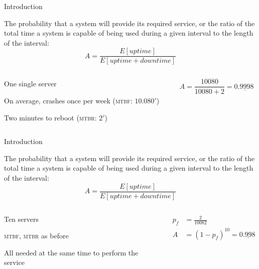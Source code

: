 \begin{frame}{Introduction}
	
\begin{definition}[Availability]
The probability that a system will provide its required service, or the ratio
of the total time a system is capable of being used during a given interval to
the length of the interval:
\[
  A = \frac{E[\mathit{uptime}]}{E[\mathit{uptime} + \mathit{downtime}] }
\]
\end{definition}

\begin{example}
\begin{columns}[t]
\begin{column}{0.55\textwidth}
\BI
\item One single server
\item On average, crashes once per week (\textsc{mtbf}: $10.080'$)
\item Two minutes to reboot (\textsc{mtbr}: $2'$)
\EI
\end{column}
\begin{column}{0.45\textwidth}
\pause
\[
  A = \frac{10080}{10080+2} = 0.\underline{999}8
\]
\end{column}
\end{columns}
\end{example}

\end{frame}

\begin{frame}{Introduction}
	
\begin{definition}[Availability]
The probability that a system will provide its required service, or the ratio
of the total time a system is capable of being used during a given interval to
the length of the interval:
\[
  A = \frac{E[\mathit{uptime}]}{E[\mathit{uptime} + \mathit{downtime}] }
\]
\end{definition}

\begin{example}
\begin{columns}[t]
\begin{column}{0.55\textwidth}
\BI
\item Ten servers
\item \textsc{mtbf}, \textsc{mtbr} as before
\item All needed at the same time to perform the service
\EI
\end{column}
\begin{column}{0.45\textwidth}
\pause
\begin{align*}
  p_f &= \frac{2}{10082}\\
  A &= (1-p_f)^{10} = 0.\underline{99}8
\end{align*}
\end{column}
\end{columns}
\end{example}


\end{frame}


